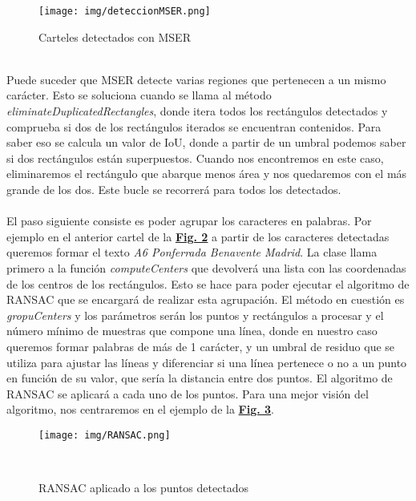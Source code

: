 \documentclass[a4paper, 12pt]{article}
\begin{document}
\begin{figure}[h]
	\centering
	\texttt{[image: img/deteccionMSER.png]}
 	\caption{Carteles detectados con MSER}\vspace{0.5cm}
	\label{fig:normalizacion}
\end{figure}
\\Puede suceder que MSER detecte varias regiones que pertenecen a un mismo carácter. Esto se soluciona cuando se llama al método \textit{eliminateDuplicatedRectangles}, donde itera todos los rectángulos detectados y comprueba si dos de los rectángulos iterados se encuentran contenidos. Para saber eso se calcula un valor de IoU, donde a partir de un umbral podemos saber si dos rectángulos están superpuestos. Cuando nos encontremos en este caso, eliminaremos el rectángulo que abarque menos área y nos quedaremos con el más grande de los dos. Este bucle se recorrerá para todos los detectados.
\\\\
El paso siguiente consiste es poder agrupar los caracteres en palabras. Por ejemplo en el anterior cartel de la \textbf{\hyperref[fig:normalizacion]{Fig. 2}} a partir de los caracteres detectadas queremos formar el texto \textit{A6 Ponferrada Benavente Madrid}. La clase llama primero a la función \textit{computeCenters} que devolverá una lista con las coordenadas de los centros de los rectángulos. Esto se hace para poder ejecutar el algoritmo de RANSAC que se encargará de realizar esta agrupación. El método en cuestión es \textit{gropuCenters} y los parámetros serán los puntos y rectángulos a procesar y el número mínimo de muestras que compone una línea, donde en nuestro caso queremos formar palabras de más de 1 carácter, y un umbral de residuo que se utiliza para ajustar las líneas y diferenciar si una línea pertenece o no a un punto en función de su valor, que sería la distancia entre dos puntos. El algoritmo de RANSAC se aplicará a cada uno de los puntos. Para una mejor visión del algoritmo, nos centraremos en el ejemplo de la \textbf{\hyperref[fig:normalizacion]{Fig. 3}}.
\begin{figure}[h]
	\centering
	\texttt{[image: img/RANSAC.png]}
 	\caption{RANSAC aplicado a los puntos detectados}\
	\label{fig:normalizacion}
\end{figure}
\end{document}
